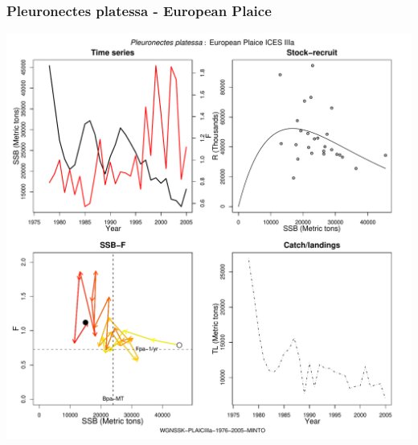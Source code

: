 \subsubsection{Pleuronectes platessa - European Plaice}
\begin{center}
\includegraphics[width=1.2\textwidth]{../R/figures/WGNSSK-PLAICIIIa-1976-2005-MINTO.pdf}
\end{center}

